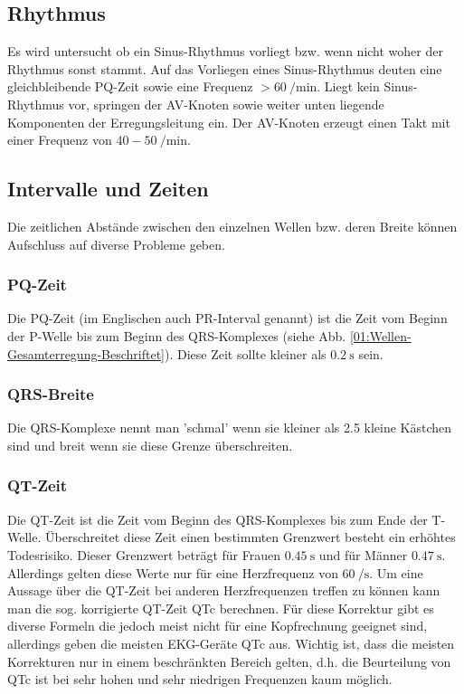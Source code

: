 \subsection{Rhythmus}
Es wird untersucht ob ein Sinus-Rhythmus vorliegt bzw. wenn nicht woher der Rhythmus sonst stammt. Auf das Vorliegen eines Sinus-Rhythmus deuten eine gleichbleibende PQ-Zeit sowie eine Frequenz $>\SI{60}{\per\minute}$.
Liegt kein Sinus-Rhythmus vor, springen der AV-Knoten sowie weiter unten liegende Komponenten der Erregungsleitung ein. Der AV-Knoten erzeugt einen Takt mit einer Frequenz von $\num{40}-\SI{50}{\per\minute}$.

\subsection{Intervalle und Zeiten}
Die zeitlichen Abstände zwischen den einzelnen Wellen bzw. deren Breite können Aufschluss auf diverse Probleme geben.

\subsubsection{PQ-Zeit}
Die PQ-Zeit (im Englischen auch PR-Interval genannt) ist die Zeit vom Beginn der P-Welle bis zum Beginn des QRS-Komplexes (siehe Abb. \ref{01:Wellen-Gesamterregung-Beschriftet}). Diese Zeit sollte kleiner als $\SI{0.2}{\second}$ sein.

\subsubsection{QRS-Breite}
Die QRS-Komplexe nennt man 'schmal' wenn sie kleiner als 2.5 kleine Kästchen sind und breit wenn sie diese Grenze überschreiten.

\subsubsection{QT-Zeit}
Die QT-Zeit ist die Zeit vom Beginn des QRS-Komplexes bis zum Ende der T-Welle. Überschreitet diese Zeit einen bestimmten Grenzwert besteht ein erhöhtes Todesrisiko. Dieser Grenzwert beträgt für Frauen $\SI{0.45}{\second}$ und für Männer $\SI{0.47}{\second}$. Allerdings gelten diese Werte nur für eine Herzfrequenz von $\SI{60}{\per\second}$. Um eine Aussage über die QT-Zeit bei anderen Herzfrequenzen treffen zu können kann man die sog. korrigierte QT-Zeit QTc berechnen. Für diese Korrektur gibt es diverse Formeln die jedoch meist nicht für eine Kopfrechnung geeignet sind, allerdings geben die meisten EKG-Geräte QTc aus. Wichtig ist, dass die meisten Korrekturen nur in einem beschränkten Bereich gelten, d.h. die Beurteilung von QTc ist bei sehr hohen und sehr niedrigen Frequenzen kaum möglich.

